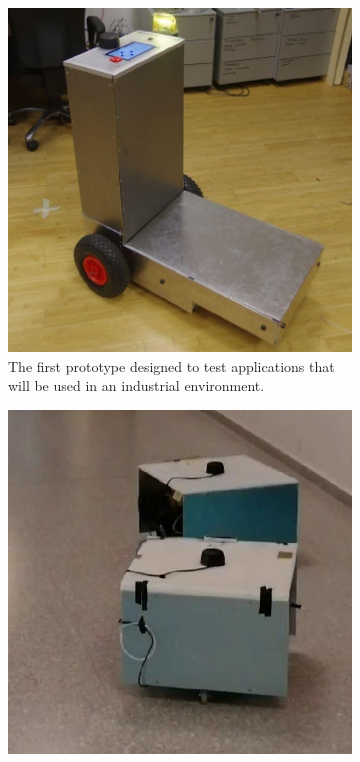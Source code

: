 \begin{figure}[!h]
	\centering
	\begin{subfigure}{0.44\textwidth}
		\includegraphics[width=\linewidth]{images/introduction/robot_shelfy}
		\captionsetup{margin=0.5cm}
		\caption{The first prototype designed to test applications that will be used in an industrial environment.}
	\end{subfigure}
	\begin{subfigure}{0.44\textwidth}
		\includegraphics[width=\linewidth]{images/introduction/robot_shelfini}

\end{subfigure}
\end{figure}
